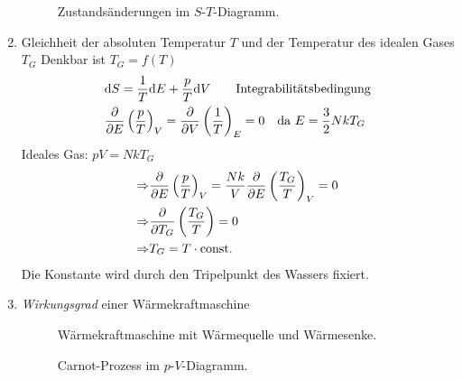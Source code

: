 \begin{enumerate}
        \begin{figure}[H]
        \centering
        \def\svgwidth{0.6\textwidth}
        
        \caption{Zustandsänderungen im $S$-$T$-Diagramm.}
        \label{img:adiabate_ST}
    \end{figure}
         
    \item Gleichheit der absoluten Temperatur $T$ und der Temperatur des idealen Gases $T_G$
    Denkbar ist $T_G = f(T)$
    \begin{equation}
        \begin{split}
            & \mathrm{d} S = \frac{1}{T} \mathrm{d} E + \frac{p}{T}\mathrm{d} V \qquad \text{Integrabilitätsbedingung} \\
            & \frac{\partial}{\partial E} \left( \frac{p}{T} \right)_V = \frac{\partial}{\partial V} \left( \frac{1}{T} \right)_E = 0 \quad \text{da } E = \frac{3}{2} N k T_G
        \end{split}
    \end{equation}
    Ideales Gas: $p V = N k T_G$
    \begin{equation}
        \begin{split}
            \Rightarrow & \frac{\partial}{\partial E} \left( \frac{p}{T} \right)_V = \frac{N k }{V} \frac{\partial}{\partial E} \left( \frac{T_G}{T} \right)_V = 0 \\
            \Rightarrow & \frac{\partial}{\partial T_G} \left( \frac{T_G}{T} \right) = 0 \\
            \Rightarrow & T_G = T \cdot \text{const.}
        \end{split}
    \end{equation}
    Die Konstante wird durch den Tripelpunkt des Wassers fixiert.
    \item \emph{Wirkungsgrad} einer Wärmekraftmaschine
    
    \begin{figure}[H]
        \centering
        \def\svgwidth{0.4\textwidth}
        
        \caption{Wärmekraftmaschine mit Wärmequelle und Wärmesenke.}
        \label{img:waermekraftmaschine}
    \end{figure}
     
       \begin{figure}[H]
        \centering
        \def\svgwidth{0.5\textwidth}
        
        \caption{Carnot-Prozess im $p$-$V$-Diagramm.}
        \label{img:carnot}
    \end{figure}
       

\end{enumerate}
